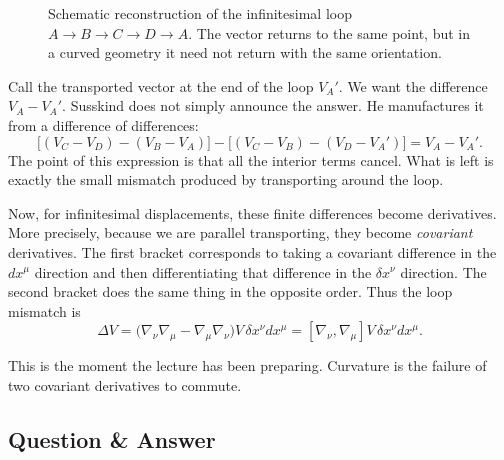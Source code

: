 \begin{figure}[htbp]
\centering
{}
\caption{Schematic reconstruction of the infinitesimal loop \(A\to B\to C\to D\to A\). The vector returns to the same point, but in a curved geometry it need not return with the same orientation.}
\end{figure}

Call the transported vector at the end of the loop \(V_A'\). We want the difference \(V_A-V_A'\). Susskind does not simply announce the answer. He manufactures it from a difference of differences:
\begin{equation}
\big[(V_C-V_D)-(V_B-V_A)\big]
-
\big[(V_C-V_B)-(V_D-V_A')\big]
=
V_A - V_A'.
\end{equation}
The point of this expression is that all the interior terms cancel. What is left is exactly the small mismatch produced by transporting around the loop.

Now, for infinitesimal displacements, these finite differences become derivatives. More precisely, because we are parallel transporting, they become \emph{covariant} derivatives. The first bracket corresponds to taking a covariant difference in the \(dx^\mu\) direction and then differentiating that difference in the \(\delta x^\nu\) direction. The second bracket does the same thing in the opposite order. Thus the loop mismatch is
\begin{equation}
\Delta V
=
\big(\nabla_\nu\nabla_\mu-\nabla_\mu\nabla_\nu\big)V\,\delta x^\nu dx^\mu
=
[\nabla_\nu,\nabla_\mu]V\,\delta x^\nu dx^\mu.
\end{equation}

This is the moment the lecture has been preparing. Curvature is the failure of two covariant derivatives to commute.

\subsection{Question \& Answer}

